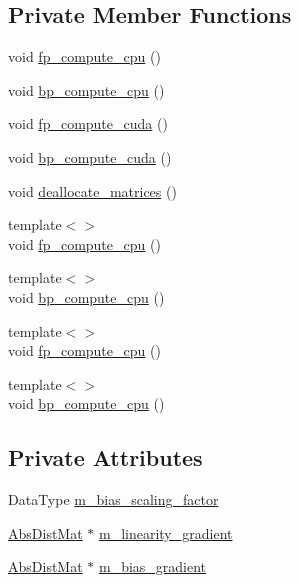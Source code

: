 \subsection*{Private Member Functions}
\begin{DoxyCompactItemize}
\item 
void \hyperlink{classlbann_1_1fully__connected__layer_a732ac5715ba0cea535c2bd062f634527}{fp\+\_\+compute\+\_\+cpu} ()
\item 
void \hyperlink{classlbann_1_1fully__connected__layer_affbaa1ecb08e45ff6f9ab195227d0084}{bp\+\_\+compute\+\_\+cpu} ()
\item 
void \hyperlink{classlbann_1_1fully__connected__layer_a720c048ee32b5620a99886177be4f577}{fp\+\_\+compute\+\_\+cuda} ()
\item 
void \hyperlink{classlbann_1_1fully__connected__layer_a521aa4a5b88ef00f554fe21a850f6596}{bp\+\_\+compute\+\_\+cuda} ()
\item 
void \hyperlink{classlbann_1_1fully__connected__layer_a91f359a41cfbab6f21bd67bccb8409b1}{deallocate\+\_\+matrices} ()
\item 
{\footnotesize template$<$$>$ }\\void \hyperlink{classlbann_1_1fully__connected__layer_a6c2be8390e58d9b224e901b8500b2b3c}{fp\+\_\+compute\+\_\+cpu} ()
\item 
{\footnotesize template$<$$>$ }\\void \hyperlink{classlbann_1_1fully__connected__layer_a4c5b0eea2036c41b15ec03594dac8dc2}{bp\+\_\+compute\+\_\+cpu} ()
\item 
{\footnotesize template$<$$>$ }\\void \hyperlink{classlbann_1_1fully__connected__layer_a97243a5aa3474ff70c6f2d7f7e995e65}{fp\+\_\+compute\+\_\+cpu} ()
\item 
{\footnotesize template$<$$>$ }\\void \hyperlink{classlbann_1_1fully__connected__layer_af65e177e5f2b1a1d2854a04b433f7dae}{bp\+\_\+compute\+\_\+cpu} ()
\end{DoxyCompactItemize}
\subsection*{Private Attributes}
\begin{DoxyCompactItemize}
\item 
Data\+Type \hyperlink{classlbann_1_1fully__connected__layer_ae02eaffd5528bf572883f8b06d1b40c0}{m\+\_\+bias\+\_\+scaling\+\_\+factor}
\item 
\hyperlink{base_8hpp_a9a697a504ae84010e7439ffec862b470}{Abs\+Dist\+Mat} $\ast$ \hyperlink{classlbann_1_1fully__connected__layer_ab80f9cb94662ce4d90aa6d8b5cfa0803}{m\+\_\+linearity\+\_\+gradient}
\item 
\hyperlink{base_8hpp_a9a697a504ae84010e7439ffec862b470}{Abs\+Dist\+Mat} $\ast$ \hyperlink{classlbann_1_1fully__connected__layer_a6510917c573378f40789a1d16db22b4e}{m\+\_\+bias\+\_\+gradient}
\end{DoxyCompactItemize}
